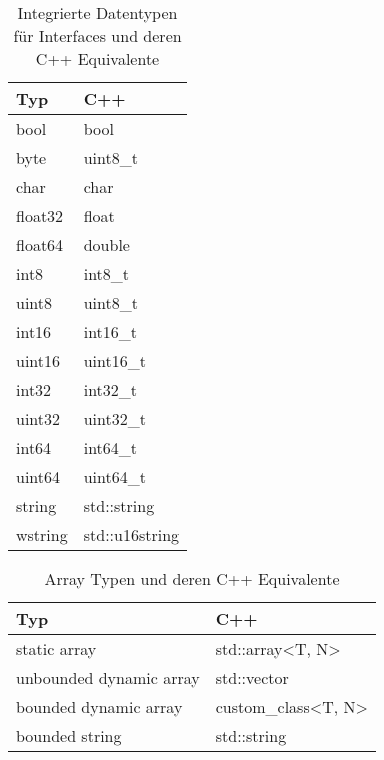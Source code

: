 \begin{table}[ht]
    \centering
    \caption{Integrierte Datentypen für Interfaces und deren C++ Equivalente}
\begin{tabular}{|l|l|}
\hline
\textbf{Typ} & \textbf{C++}   \\ \hline
bool         & bool           \\ \hline
byte         & uint8\_t       \\ \hline
char         & char           \\ \hline
float32      & float          \\ \hline
float64      & double         \\ \hline
int8         & int8\_t        \\ \hline
uint8        & uint8\_t       \\ \hline
int16        & int16\_t       \\ \hline
uint16       & uint16\_t      \\ \hline
int32        & int32\_t       \\ \hline
uint32       & uint32\_t      \\ \hline
int64        & int64\_t       \\ \hline
uint64       & uint64\_t      \\ \hline
string       & std::string    \\ \hline
wstring      & std::u16string \\ \hline
\end{tabular}
    \label{tab:builtintypes}
\end{table}
\begin{table}[ht]
    \centering
    \caption{Array Typen und deren C++ Equivalente}
\begin{tabular}{|l|l|}
\hline
\textbf{Typ} & \textbf{C++}   \\ \hline
static array         & std::array<T, N>           \\ \hline
unbounded dynamic array         & std::vector       \\ \hline
bounded dynamic array         & custom\_class<T, N>           \\ \hline
bounded string      & std::string          \\ \hline
\end{tabular}
    \label{tab:arraytypes}
\end{table}
